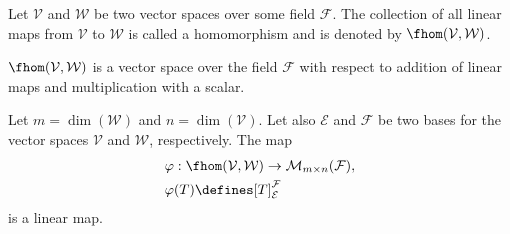 \begin{definition}\label{def-homomorphism}
	Let $\mathcal{V}$ and $\mathcal{W}$ be two vector spaces over some field $\mathcal{F}$.
	The collection of all linear maps from $\mathcal{V}$ to $\mathcal{W}$ is called a homomorphism
	and is denoted by $\fhom(\mathcal{V},\mathcal{W})$.
\end{definition}

\begin{thm}\label{thm-homomorphism-vector-space}
	$\fhom(\mathcal{V},\mathcal{W})$ is a vector space over the field $\mathcal{F}$
	with respect to addition of linear maps and multiplication with a scalar.
\end{thm}

\begin{thm}\label{thm-hom-linear-maps}
	Let $m=\dim(\mathcal{W})$ and $n=\dim(\mathcal{V})$. Let also $\mathcal{E}$ and
	$\mathcal{F}$ be two bases for the vector spaces $\mathcal{V}$ and $\mathcal{W}$,
	respectively. The map
	\begin{align}
		 & \varphi:\fhom(\mathcal{V},\mathcal{W})\to\mathcal{M}_{m \times n}(\mathcal{F}),\nonumber \\
		 & \varphi(T)\defines[T]_\mathcal{E}^\mathcal{F}
	\end{align}
	is a linear map.
\end{thm}

